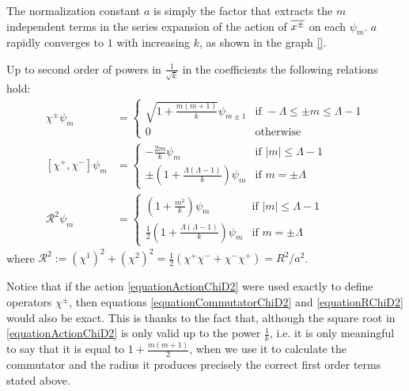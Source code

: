 The normalization constant $a$ is simply the factor that extracts the $m$ independent terms in the series expansion of the action of $\overline{x^\pm}$ on each $\psi_m$. $a$ rapidly converges to $1$ with increasing $k$, as shown in the graph \ref{}.

\begin{proposition} Up to second order of powers in $\frac{1}{\sqrt{k}}$ in the coefficients the following relations hold:
\begin{align}\label{equationActionChiD2}
    \chi^\pm  \psi_m
        &= \begin{cases}
        \sqrt{1 + \frac{m(m+1)}{k}}  \psi_{m \pm 1} & \text{if } -\Lambda \leq \pm m \leq \Lambda -1
        \\
        0 & \text{otherwise}
        \end{cases}\\
    \label{equationCommutatorChiD2}
    [\chi^+, \chi^-]  \psi_m
        &= \begin{cases}
         -\frac{2m}{k} \psi_{m} & \text{if } |m| \leq \Lambda -1
        \\
        \pm \left( 1 + \frac{\Lambda(\Lambda-1)}{k} \right) \psi_{m} & \text{if } m = \pm \Lambda 
        \end{cases}\\
    \label{equationRChiD2}
    \mathcal R^2  \psi_m
        &= \begin{cases}
        \left( 1+ \frac{m^2}{k} \right) \psi_{m} & \text{if } |m| \leq \Lambda -1
        \\
        \frac{1}{2} \left( 1+ \frac{\Lambda(\Lambda-1)}{k} \right) \psi_{m} & \text{if } m = \pm \Lambda 
        \end{cases}
\end{align}
where $\mathcal R^2 := (\chi^1)^2 + (\chi^2)^2 = \frac{1}{2}(\chi^+\chi^- + \chi^-\chi^+)= R^2/a^2$.
\end{proposition}
\begin{remark}
Notice that if the action \eqref{equationActionChiD2} were used exactly to define operators $\chi^\pm$, then equations \eqref{equationCommutatorChiD2} and \eqref{equationRChiD2} would also be exact. This is thanks to the fact that, although the square root in \eqref{equationActionChiD2} is only valid up to the power $\frac{1}{k}$, i.e. it is only meaningful to say that it is equal to $ 1+\frac{m(m+1)}{2}$, when we use it to calculate the commutator and the radius it produces precisely the correct first order terms stated above.
\end{remark}

